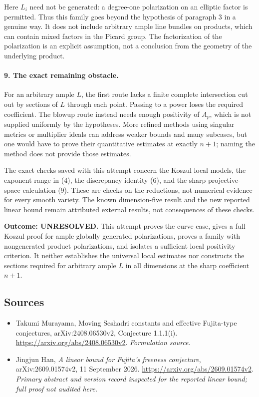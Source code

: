 \documentclass[11pt]{article}
\begin{document}
Here $L_i$ need not be generated: a degree-one polarization on an elliptic factor is permitted. Thus this family goes beyond the hypothesis of paragraph 3 in a genuine way. It does not include arbitrary ample line bundles on products, which can contain mixed factors in the Picard group. The factorization of the polarization is an explicit assumption, not a conclusion from the geometry of the underlying product.

\paragraph{9. The exact remaining obstacle.}
For an arbitrary ample $L$, the first route lacks a finite complete intersection cut out by sections of $L$ through each point. Passing to a power loses the required coefficient. The blowup route instead needs enough positivity of $A_p$, which is not supplied uniformly by the hypotheses. More refined methods using singular metrics or multiplier ideals can address weaker bounds and many subcases, but one would have to prove their quantitative estimates at exactly $n+1$; naming the method does not provide those estimates.

The exact checks saved with this attempt concern the Koszul local models, the exponent range in (4), the discrepancy identity (6), and the sharp projective-space calculation (9). These are checks on the reductions, not numerical evidence for every smooth variety. The known dimension-five result and the new reported linear bound remain attributed external results, not consequences of these checks.

\textbf{Outcome: UNRESOLVED.} This attempt proves the curve case, gives a full Koszul proof for ample globally generated polarizations, proves a family with nongenerated product polarizations, and isolates a sufficient local positivity criterion. It neither establishes the universal local estimates nor constructs the sections required for arbitrary ample $L$ in all dimensions at the sharp coefficient $n+1$.

\subsection{Sources}
\begin{itemize}
\item[S1]Takumi Murayama, Moving Seshadri constants and effective Fujita-type conjectures, arXiv:2408.06530v2, Conjecture 1.1.1(i).
\url{https://arxiv.org/abs/2408.06530v2}.
\textit{Formulation source.}
\item[E1]Jingjun Han, \textit{A linear bound for Fujita's freeness conjecture}, arXiv:2609.01574v2, 11 September 2026.
\url{https://arxiv.org/abs/2609.01574v2}.
\textit{Primary abstract and version record inspected for the reported linear bound; full proof not audited here.}
\end{itemize}
\end{document}
